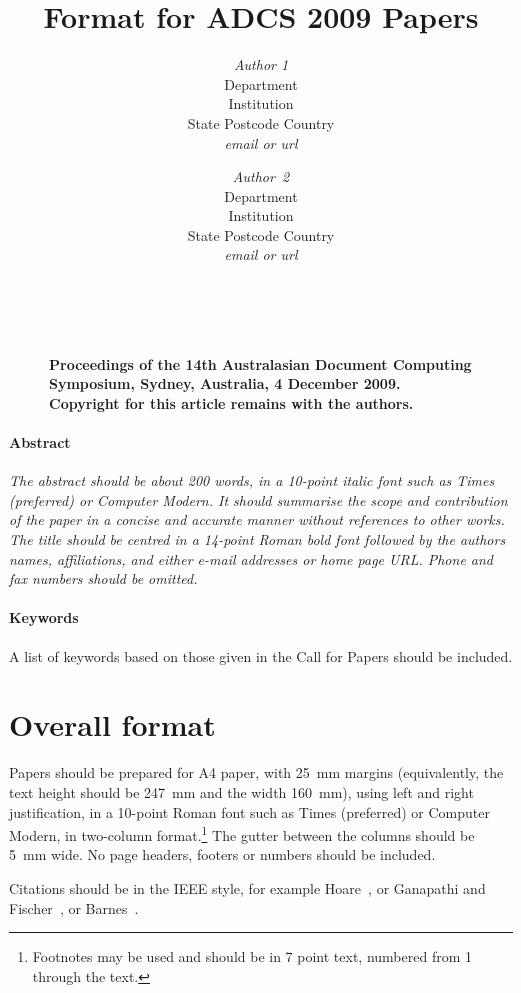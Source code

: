 \documentclass[twocolumn]{article}
\title{Format for ADCS 2009 Papers}
\author{{\em Author 1}\\[1ex]
        Department\\Institution\\State Postcode Country\\[1ex]
        {\em email or url} \and
        {\em Author~2}\\[1ex]
        Department\\Institution\\State Postcode Country\\[1ex]
        {\em email or url}}
\date{}
\begin{document}
\maketitle
\thispagestyle{empty}


        \begin{figure}[b]
	~\\
        \noindent
        {\small\raggedright\bf
        Proceedings of the 14th Australasian 
	Document Computing Symposium,
	Sydney, Australia,
        4 December 2009.
	Copyright for this article remains with the authors.
        }
        \end{figure}


\paragraph*{Abstract}
\noindent
{\it 
The abstract should be about 200 words, in a 10-point italic
font such as Times (preferred) or Computer Modern.
It should summarise the scope and contribution of the paper in a
concise and accurate manner without references to other works.
The title should be centred in a 14-point Roman bold font followed by
the authors names, affiliations, and either e-mail addresses or home
page URL.
Phone and fax numbers should be omitted.
} 

\paragraph*{Keywords} 
A list of keywords based on those given in the Call for Papers should
be included.


\section{Overall format}

Papers should be prepared for A4 paper, with 25~mm margins
(equivalently, the text height should be 247~mm and the width 160~mm),
using left and right justification, in a 10-point Roman font such as
Times (preferred) or Computer Modern, in two-column
format.\footnote{Footnotes may be used and should be in 7 point text,
  numbered from 1 through the text.}  The gutter between the columns
should be 5~mm wide.  No page headers, footers or numbers should be
included.

Citations should be in the IEEE style, for example
Hoare~\cite{Hoare73}, or Ganapathi and
Fischer~\cite{GanapathiFischer82}, or Barnes~\cite{Barnes80,Barnes89}.
\end{document}
